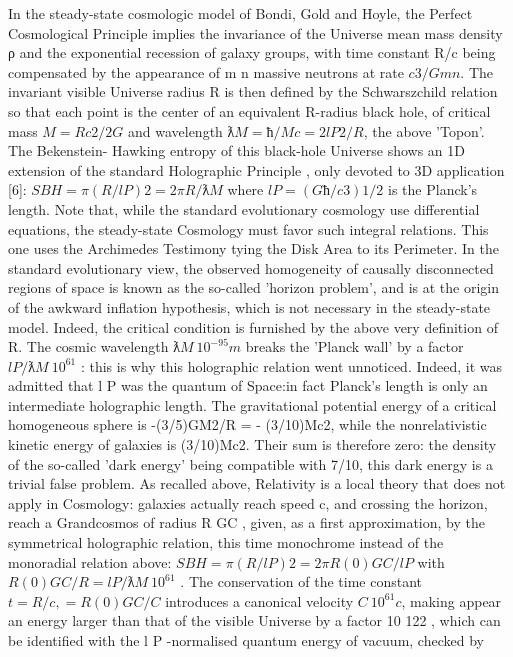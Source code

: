 In the steady-state cosmologic model of Bondi, Gold and Hoyle, the Perfect Cosmological
Principle implies the invariance of the Universe mean mass density ρ and the exponential recession
of galaxy groups, with time constant R/c being compensated by the appearance of m n massive
neutrons at rate $c 3 /Gm n $. The invariant visible Universe radius R is then defined by the
Schwarszchild relation so that each point is the center of an equivalent R-radius black hole, of
critical mass $M = Rc 2 /2G$ and wavelength $ƛ M = ħ/Mc = 2l P2 /R$, the above 'Topon'. The Bekenstein-
Hawking entropy of this black-hole Universe shows an 1D extension of the standard Holographic
Principle , only devoted to 3D application [6]:
$S BH = π(R/l P )2 = 2πR/ƛ M$
where $l P = (Għ/c 3 ) 1/2$ is the Planck's length. Note that, while the standard evolutionary cosmology
use differential equations, the steady-state Cosmology must favor such integral relations. This one
uses the Archimedes Testimony tying the Disk Area to its Perimeter.
In the standard evolutionary view, the observed homogeneity of causally disconnected regions
of space is known as the so-called 'horizon problem', and is at the origin of the awkward inflation
hypothesis, which is not necessary in the steady-state model. Indeed, the critical condition is
furnished by the above very definition of R.
The cosmic wavelength $ƛ M ~ 10^{-95} m$ breaks the 'Planck wall' by a factor $l P /ƛ M ~ 10^61$ : this is why
this holographic relation went unnoticed. Indeed, it was admitted that l P was the quantum of Space:in fact Planck's length is only an intermediate holographic length.
The gravitational potential energy of a critical homogeneous sphere is -(3/5)GM2/R = -
(3/10)Mc2, while the nonrelativistic kinetic energy of galaxies is (3/10)Mc2. Their sum is therefore
zero: the density of the so-called 'dark energy' being compatible with 7/10, this dark energy is a
trivial false problem. As recalled above, Relativity is a local theory that does not apply in
Cosmology: galaxies actually reach speed c, and crossing the horizon, reach a Grandcosmos of
radius R GC , given, as a first approximation, by the symmetrical holographic relation, this time
monochrome instead of the monoradial relation above:
$S BH = π(R/l P )2 = 2πR (0) GC /l P$
with $R (0) GC /R = l P /ƛ M ~ 10^{61}$ . The conservation of the time constant $t = R/c, = R (0) GC /C$ introduces a
canonical velocity $C ~ 10^{61} c$, making appear an energy larger than that of the visible Universe by a
factor 10 122 , which can be identified with the l P -normalised quantum energy of vacuum, checked by
